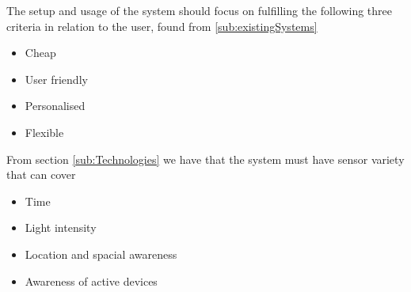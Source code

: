 The setup and usage of the system should focus on fulfilling the following three criteria in relation to the user, found from \cref{sub:existingSystems}
\begin{itemize}
  \item Cheap
  \item User friendly
  \item Personalised
  \item Flexible
\end{itemize}

From section \cref{sub:Technologies} we have that the system must have sensor variety that can cover
\begin{itemize}
  \item Time
  \item Light intensity
  \item Location and spacial awareness
  \item Awareness of active devices
\end{itemize}
